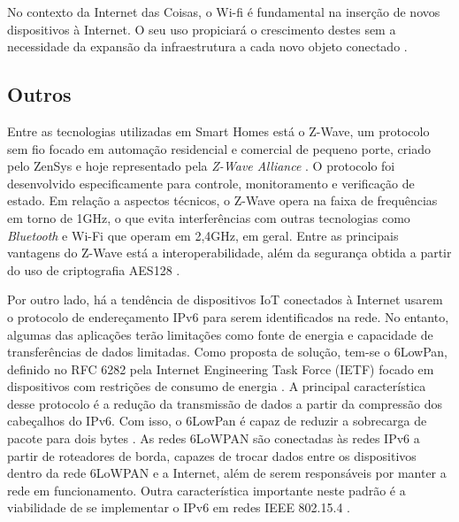 No contexto da Internet das Coisas, o Wi-fi é fundamental na inserção de novos dispositivos à Internet. O seu uso propiciará o crescimento destes sem a necessidade da expansão da infraestrutura a cada novo objeto conectado \cite{Suresh2014}.

\subsection{Outros}
Entre as tecnologias utilizadas em Smart Homes está o Z-Wave, um protocolo sem fio focado em automação residencial e comercial de pequeno porte, criado pelo ZenSys e hoje representado pela \textit{Z-Wave Alliance } \cite{Gomez2010}. O protocolo foi desenvolvido especificamente para controle, monitoramento e verificação de estado. Em relação a aspectos técnicos, o Z-Wave opera na faixa de frequências em torno de 1GHz, o que evita interferências com outras tecnologias como \textit{Bluetooth} e Wi-Fi que operam em 2,4GHz, em geral. Entre as principais vantagens do Z-Wave está a interoperabilidade, além da segurança obtida a partir do uso de criptografia  AES128 \cite{Z-WaveAlliance2015}.

Por outro lado, há a tendência de dispositivos IoT conectados à Internet usarem o protocolo de endereçamento IPv6 para serem identificados na rede. No entanto, algumas das aplicações terão limitações como fonte de energia e capacidade de transferências de dados limitadas. Como proposta de solução, tem-se o 6LowPan, definido no RFC 6282 pela Internet Engineering Task Force (IETF) focado em dispositivos com restrições de consumo de energia \cite{Olsson2014}. A principal característica desse protocolo é a redução da transmissão de dados a partir da compressão dos cabeçalhos do IPv6. Com isso, o 6LowPan é capaz de reduzir a sobrecarga de pacote para dois bytes \cite{Al-Fuqaha2015}. As redes 6LoWPAN são conectadas às redes IPv6 a partir de roteadores de borda, capazes de trocar dados entre os dispositivos dentro da rede 6LoWPAN e a Internet, além de serem responsáveis por manter a rede em funcionamento. Outra característica importante neste padrão é a viabilidade de se implementar o IPv6 em redes IEEE 802.15.4 \cite{Olsson2014}.






